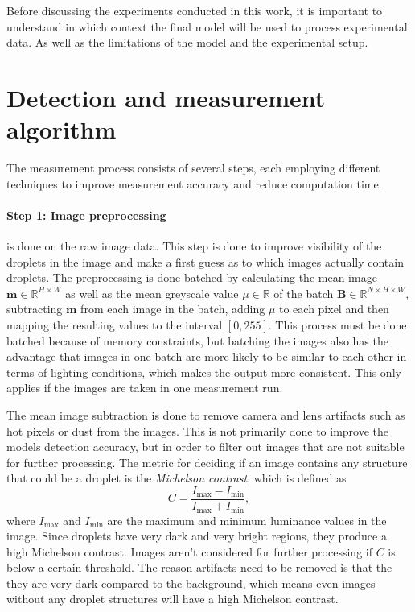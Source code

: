 Before discussing the experiments conducted in this work, it is important to understand in which context the final model will be used to process experimental data. As well as the limitations of the model and the experimental setup.

\section{Detection and measurement algorithm}
\label{sec:algorithm}

The measurement process consists of several steps, each employing different techniques to improve measurement accuracy and reduce computation time.

\paragraph{Step 1: Image preprocessing} is done on the raw image data. This step is done to improve visibility of the droplets in the image and make a first guess as to which images actually contain droplets. 
The preprocessing is done batched by calculating the mean image $\mathbf{m}\in\mathbb{R}^{H\times W}$ as well as the mean greyscale value $\mu\in\mathbb{R}$ of the batch $\mathbf{B}\in\mathbb{R}^{N\times H\times W}$, subtracting $\mathbf{m}$ from each image in the batch, adding $\mu$ to each pixel and then mapping the resulting values to the interval $[0,255]$.
This process must be done batched because of memory constraints, but batching the images also has the advantage that images in one batch are more likely to be similar to each other in terms of lighting conditions, which makes the output more consistent.
This only applies if the images are taken in one measurement run.

The mean image subtraction is done to remove camera and lens artifacts such as hot pixels or dust from the images.
This is not primarily done to improve the models detection accuracy, but in order to filter out images that are not suitable for further processing.
The metric for deciding if an image contains any structure that could be a droplet is the \emph{Michelson contrast}, which is defined as 
$$
    C = \frac{I_\text{max}-I_\text{min}}{I_\text{max}+I_\text{min}},
$$
where $I_\text{max}$ and $I_\text{min}$ are the maximum and minimum luminance values in the image.
Since droplets have very dark and very bright regions, they produce a high Michelson contrast.
Images aren't considered for further processing if $C$ is below a certain threshold.
The reason artifacts need to be removed is that the they are very dark compared to the background, which means even images without any droplet structures will have a high Michelson contrast.

